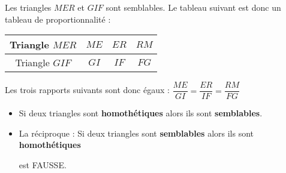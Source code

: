 \begin{exemple*1}

    \medskip
    \begin{minipage}{0.45\linewidth}
        Les triangles $MER$ et $GIF$ sont semblables. Le tableau suivant est donc un tableau de proportionnalité :

        \medskip
        \begin{tabular}{|c|c|c|c|}
        \hline 
        Triangle $MER$ & $ME$ & $ER$ & $RM$ \\ 
        \hline 
        Triangle $GIF$ & $GI$ & $IF$ & $FG$ \\ 
        \hline 
        \end{tabular}

        \medskip
        Les trois rapports suivants sont donc égaux : $\dfrac{ME}{GI}=\dfrac{ER}{IF}=\dfrac{RM}{FG}$
    \end{minipage}
    \hfill
    \begin{minipage}{0.5\linewidth}
    \end{minipage}
\end{exemple*1}

\begin{remarque}
    \begin{itemize}
        \item Si deux triangles sont \textbf{homothétiques} alors ils sont \textbf{semblables}.
        \item La réciproque : \og Si deux triangles sont \textbf{semblables} alors ils sont  \textbf{homothétiques} \fg 
        
        est FAUSSE.
    \end{itemize}
\end{remarque}
